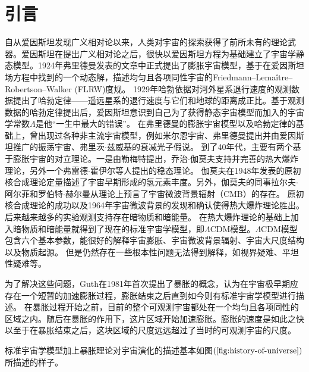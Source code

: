 \chapter{引言}%
\label{chap:introduction}

自从爱因斯坦发现广义相对论以来，人类对宇宙的探索获得了前所未有的理论武器。爱因斯坦在提出广义相对论之后，很快以爱因斯坦方程为基础建立了宇宙学静态模型。1924年弗里德曼发表的文章\citep{friedmann1924moglichkeit}中正式提出了膨胀宇宙模型，基于在爱因斯坦场方程中找到的一个动态解，描述均匀且各项同性宇宙的Friedmann–Lemaître–Robertson–Walker
(FLRW)度规。
1929年哈勃依据对河外星系退行速度的观测数据提出了哈勃定律——遥远星系的退行速度与它们和地球的距离成正比\citep{hubble1929relation}。基于观测数据的哈勃定律提出后，爱因斯坦意识到自己为了获得静态宇宙模型而加入的宇宙学常数$\Lambda$是他“一生中最大的错误”。
在弗里德曼的膨胀宇宙模型以及哈勃定律的基础上，曾出现过各种非主流宇宙模型，例如米尔恩宇宙\citep{milne1936relativity}、弗里德曼提出并由爱因斯坦推广的振荡宇宙、弗里茨$\cdot$兹威基的衰减光子假说\citep{zwicky1929redshift}。
到了40年代，主要有两个基于膨胀宇宙的对立理论。一是由勒梅特提出，乔治$\cdot$伽莫夫支持并完善的热大爆炸理论，另外一个弗雷德$\cdot$霍伊尔等人提出的稳态理论\citep{hoyle1948new}。
伽莫夫在1948年发表的原初核合成理论\citep{alpher1948origin}定量描述了宇宙早期形成的氢元素丰度。另外，伽莫夫的同事拉尔夫$\cdot$阿尔菲和罗伯特$\cdot$赫尔曼从理论上预言了宇宙微波背景辐射（CMB）的存在\citep{alpher1948evolution}。
原初核合成理论的成功以及1964年宇宙微波背景的发现和确认\citep{penzias1965measurement}使得热大爆炸理论胜出。
后来越来越多的实验观测支持存在暗物质\citep{zwicky1933rotverschiebung,zwicky1937masses,clowe2006direct,rubin1980rotational}和暗能量\citep{peebles2003cosmological}。
在热大爆炸理论的基础上加入暗物质和暗能量就得到了现在的标准宇宙学模型，即$\Lambda$CDM模型。$\Lambda$CDM模型包含六个基本参数，能很好的解释宇宙膨胀、宇宙微波背景辐射、宇宙大尺度结构以及物质起源。
但是仍然存在一些根本性问题无法得到解释，如视界疑难\citep{kolb1988early}、平坦性疑难\citep{dicke1979big}等。

为了解决这些问题，Guth\citep{guth1981inflationary}在1981年首次提出了暴胀的概念，认为在宇宙极早期应存在一个短暂的加速膨胀过程，膨胀结束之后直到如今则有标准宇宙学模型进行描述。
在暴胀过程开始之前，目前的整个可观测宇宙都处在一个均匀且各项同性的区域之内。随后在暴胀的作用下，这片区域开始加速膨胀。膨胀的速度是如此之快以至于在暴胀结束之后，这块区域的尺度远远超过了当时的可观测宇宙的尺度。

标准宇宙学模型加上暴胀理论对宇宙演化的描述基本如图$(\ref{fig:history-of-universe})$所描述的样子。

